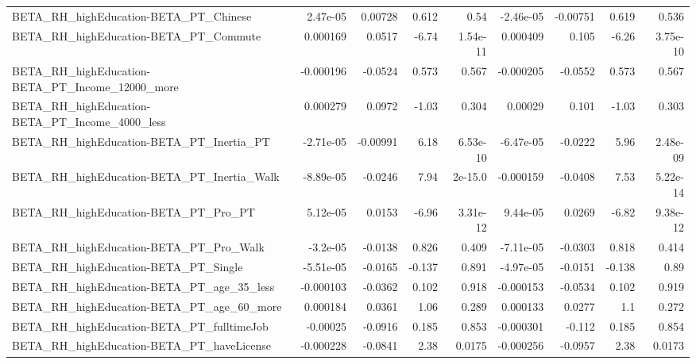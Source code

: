 \begin{tabular}{lrrrrrrrr}
BETA\_RH\_highEducation-BETA\_PT\_Chinese              &    2.47e-05 &      0.00728 &    0.612 &     0.54 &  -2.46e-05 &    -0.00751 &        0.619 &         0.536 \\
BETA\_RH\_highEducation-BETA\_PT\_Commute              &    0.000169 &       0.0517 &    -6.74 & 1.54e-11 &   0.000409 &       0.105 &        -6.26 &      3.75e-10 \\
BETA\_RH\_highEducation-BETA\_PT\_Income\_12000\_more    &   -0.000196 &      -0.0524 &    0.573 &    0.567 &  -0.000205 &     -0.0552 &        0.573 &         0.567 \\
BETA\_RH\_highEducation-BETA\_PT\_Income\_4000\_less     &    0.000279 &       0.0972 &    -1.03 &    0.304 &    0.00029 &       0.101 &        -1.03 &         0.303 \\
BETA\_RH\_highEducation-BETA\_PT\_Inertia\_PT           &   -2.71e-05 &     -0.00991 &     6.18 & 6.53e-10 &  -6.47e-05 &     -0.0222 &         5.96 &      2.48e-09 \\
BETA\_RH\_highEducation-BETA\_PT\_Inertia\_Walk         &   -8.89e-05 &      -0.0246 &     7.94 &  2e-15.0 &  -0.000159 &     -0.0408 &         7.53 &      5.22e-14 \\
BETA\_RH\_highEducation-BETA\_PT\_Pro\_PT               &    5.12e-05 &       0.0153 &    -6.96 & 3.31e-12 &   9.44e-05 &      0.0269 &        -6.82 &      9.38e-12 \\
BETA\_RH\_highEducation-BETA\_PT\_Pro\_Walk             &    -3.2e-05 &      -0.0138 &    0.826 &    0.409 &  -7.11e-05 &     -0.0303 &        0.818 &         0.414 \\
BETA\_RH\_highEducation-BETA\_PT\_Single               &   -5.51e-05 &      -0.0165 &   -0.137 &    0.891 &  -4.97e-05 &     -0.0151 &       -0.138 &          0.89 \\
BETA\_RH\_highEducation-BETA\_PT\_age\_35\_less          &   -0.000103 &      -0.0362 &    0.102 &    0.918 &  -0.000153 &     -0.0534 &        0.102 &         0.919 \\
BETA\_RH\_highEducation-BETA\_PT\_age\_60\_more          &    0.000184 &       0.0361 &     1.06 &    0.289 &   0.000133 &      0.0277 &          1.1 &         0.272 \\
BETA\_RH\_highEducation-BETA\_PT\_fulltimeJob          &    -0.00025 &      -0.0916 &    0.185 &    0.853 &  -0.000301 &      -0.112 &        0.185 &         0.854 \\
BETA\_RH\_highEducation-BETA\_PT\_haveLicense          &   -0.000228 &      -0.0841 &     2.38 &   0.0175 &  -0.000256 &     -0.0957 &         2.38 &        0.0173 \\

\end{tabular}
